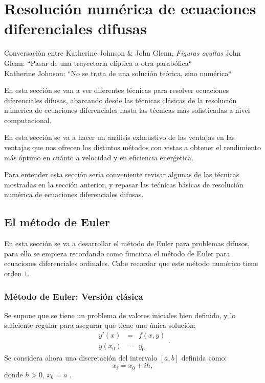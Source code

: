 \chapter{Resolución numérica de ecuaciones diferenciales difusas}
\begin{chapquote}{Conversación entre Katherine Johnson \& John Glenn, \textit{Figuras ocultas}}
	John Glenn: ``Pasar de una trayectoria elíptica a otra parabólica`` \\
	Katherine Johnson: ``No se trata de una solución teórica, sino numérica`` \cite{eulernasa}
\end{chapquote}

En esta sección se van a ver diferentes técnicas para resolver ecuaciones diferenciales difusas, abarcando desde las técnicas clásicas de la resolución númerica de ecuaciones diferenciales hasta las técnicas más sofisticadas a nivel computacional.

En esta sección se va a hacer un análisis exhaustivo de las ventajas en las ventajas que nos ofrecen los distintos métodos con vistas a obtener el rendimiento más óptimo en cuánto a velocidad y en eficiencia enerǵetica.

Para entender esta sección sería conveniente revisar algunas de las técnicas mostradas en la sección anterior, y repasar las tećnicas básicas de resolución numérica de ecuaciones diferenciales difusas.

\section{El método de Euler}
En esta sección se va a desarrollar el método de Euler para problemas difusos, para ello se empieza recordando como funciona el método de Euler para ecuaciones diferenciales ordinales. Cabe recordar que este método numérico tiene orden $1$.

\subsection{Método de Euler: Versión clásica}
Se supone que se tiene un problema de valores iniciales bien definido, y lo suficiente regular para asegurar que tiene una única solución:
\[
\begin{array}{ccc}
	y'(x) & = &f(x, y)  \\
	y(x_0) & = & y_0
\end{array}.
\]
Se considera ahora una discretación del intervalo $[a, b]$ definida como:
\[
	x_i = x_0 + i h,
\]
donde $h>0$, $x_0=a$ .

